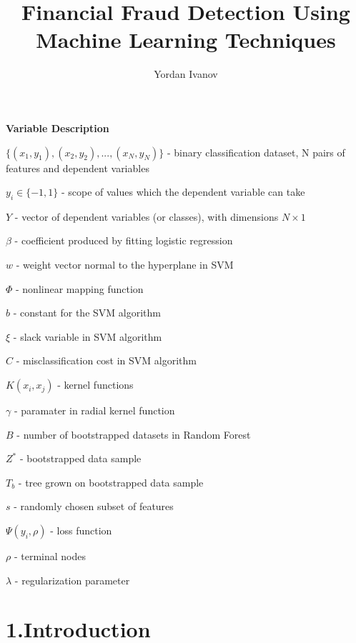 \documentclass[12pt,]{article}
\title{Financial Fraud Detection Using Machine Learning Techniques}
\author{Yordan Ivanov}
\date{}
\begin{document}
\maketitle

\centering

\raggedright
\clearpage

\tableofcontents
\clearpage

\listoffigures
\clearpage

\listoftables
\clearpage

\textbf{Variable Description}

\({\{(x_1,y_1),(x_2,y_2),...,(x_N,y_N)\}}\) - binary classification
dataset, N pairs of features and dependent variables

\(y_i \in \{-1,1\}\) - scope of values which the dependent variable can
take

\(Y\) - vector of dependent variables (or classes), with dimensions
\(N\times1\)

\(\beta\) - coefficient produced by fitting logistic regression

\(w\) - weight vector normal to the hyperplane in SVM

\(\Phi\) - nonlinear mapping function

\(b\) - constant for the SVM algorithm

\(\xi\) - slack variable in SVM algorithm

\(C\) - misclassification cost in SVM algorithm

\(K(x_i,x_j)\) - kernel functions

\(\gamma\) - paramater in radial kernel function

\(B\) - number of bootstrapped datasets in Random Forest

\(Z^*\) - bootstrapped data sample

\(T_b\) - tree grown on bootstrapped data sample

\(s\) - randomly chosen subset of features

\(\Psi(y_i,\rho)\) - loss function

\(\rho\) - terminal nodes

\(\lambda\) - regularization parameter

\clearpage

\justify

\hypertarget{introduction}{%
\section{1.Introduction}\label{introduction}}
\end{document}
